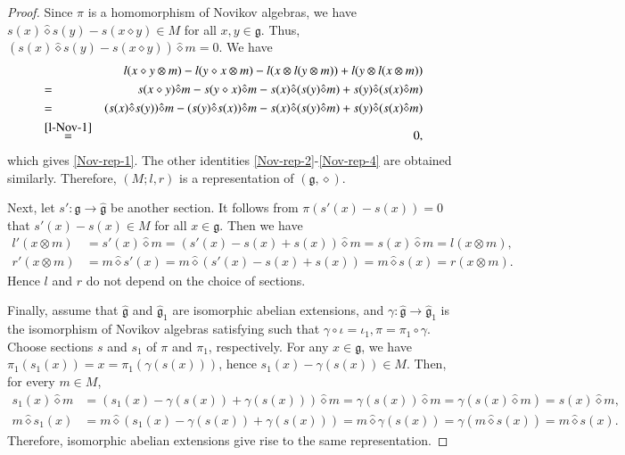 \documentclass[12pt]{amsart}
\theoremstyle{definition}
\newcommand{\g}{\mathfrak g}
\newcommand{\ot}{\otimes}
\begin{document}
\begin{proof}
 Since $\pi$ is a homomorphism of Novikov algebras, we have $s(x)\hat{\diamond}s(y)-s(x\diamond y)\in M$ for all $x,y\in\g$. Thus, $(s(x)\hat{\diamond}s(y)-s(x\diamond y))\hat{\diamond} m=0$. We have
	\begin{eqnarray*}
		&&l(x\diamond y\ot m)-l(y\diamond x\ot m)-l(x\ot l(y\ot m))+l(y\ot l(x\ot m))\\
		&=&s(x\diamond y) \hat{\diamond} m-s(y\diamond x)\hat{\diamond} m-s(x)\hat{\diamond}(s(y)\hat{\diamond} m)+s(y)\hat{\diamond}(s(x)\hat{\diamond} m)\\
		&=&(s(x)\hat{\diamond}s(y))\hat{\diamond}m-(s(y)\hat{\diamond}s(x))\hat{\diamond} m-s(x)\hat{\diamond}(s(y)\hat{\diamond} m)+s(y)\hat{\diamond}(s(x)\hat{\diamond} m)\\
		&\overset{\eqref{l-Nov-1}}{=}&0,
	\end{eqnarray*}
	which gives \eqref{Nov-rep-1}. The other identities \eqref{Nov-rep-2}-\eqref{Nov-rep-4} are obtained similarly. Therefore, $(M;l,r)$ is a representation of $(\g,\diamond)$.

	Next, let $s':\g\to\hat{\g}$ be another section. It follows from $\pi(s'(x)-s(x))=0$ that $s'(x)-s(x)\in M$ for all $x\in \g$. Then we have
	\begin{align}
		l'(x\ot m)&=s'(x)\hat{\diamond} m=(s'(x)-s(x)+s(x))\hat{\diamond} m=s(x)\hat{\diamond} m=l(x\ot m),\label{e-1}\\
		r'(x\ot m)&=m\hat{\diamond}s'(x)=m\hat{\diamond}(s'(x)-s(x)+s(x))=m\hat{\diamond}s(x)=r(x\ot m).\label{e-2}
	\end{align}
	Hence $l$ and $r$ do not depend on the choice of sections.
	
Finally, assume that $\hat{\g}$ and $\hat{\g}_1$ are isomorphic abelian extensions, and $\gamma:\hat{\g}\to \hat{\g}_1$ is the isomorphism of Novikov algebras satisfying such that $\gamma\circ\iota=\iota_1, \pi=\pi_1\circ\gamma$.
Choose sections $s$ and $s_1$ of $\pi$ and $\pi_1$, respectively. For any $x\in\g$, we have $\pi_1(s_1(x))=x=\pi_1(\gamma(s(x)))$, hence $s_1(x)-\gamma(s(x))\in M$. Then, for every $m\in M$,
\begin{align*}
	s_1(x)\hat{\diamond} m
	&= (s_1(x)-\gamma(s(x))+\gamma(s(x)))\hat{\diamond} m
	= \gamma(s(x))\hat{\diamond} m
	= \gamma(s(x)\hat{\diamond} m)
	= s(x)\hat{\diamond} m,\\
	m\hat{\diamond} s_1(x)
	&= m\hat{\diamond} (s_1(x)-\gamma(s(x))+\gamma(s(x)))
	= m\hat{\diamond} \gamma(s(x))
	= \gamma(m\hat{\diamond} s(x))
	= m\hat{\diamond} s(x).
\end{align*}
Therefore, isomorphic abelian extensions give rise to the same representation.
\end{proof}
\end{document}

